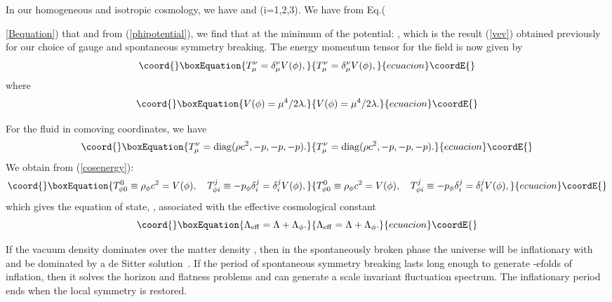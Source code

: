 \documentclass[a4paper,12pt]{article}
\begin{document}
In our homogeneous and isotropic cosmology, we have
\coordHE{} and \coordHE{} (i=1,2,3).
We have from Eq.({\ref{Bequation}) that
\coordHE{} and from (\ref{phipotential}), we find that at the
minimum of the potential: \coordHE{}, which is the result
(\ref{vev}) obtained previously for our choice of gauge and
spontaneous symmetry breaking. The energy momentum tensor for the
\myHighlight{$\phi_\mu$}\coordHE{} field is now given by
\begin{equation}\coord{}\boxEquation{
\label{cosenergy}
T_\mu^\nu=\delta^\nu_\mu V(\phi),
}{
T_\mu^\nu=\delta^\nu_\mu V(\phi),
}{ecuacion}\coordE{}\end{equation}
where
\begin{equation}\coord{}\boxEquation{
V(\phi)=\mu^4/2\lambda.
}{
V(\phi)=\mu^4/2\lambda.
}{ecuacion}\coordE{}\end{equation}

For the fluid in comoving coordinates, we have
\begin{equation}\coord{}\boxEquation{
T_\mu^\nu={\rm diag}(\rho c^2, -p, -p, -p).
}{
T_\mu^\nu={\rm diag}(\rho c^2, -p, -p, -p).
}{ecuacion}\coordE{}\end{equation}
We obtain from (\ref{cosenergy}):
\begin{equation}\coord{}\boxEquation{
T^0_{\phi0}\equiv\rho_\phi
c^2=V(\phi),\quad  T_{\phi i}^j\equiv -p_\phi\delta_i^j=\delta_i^jV(\phi),
}{
T^0_{\phi0}\equiv\rho_\phi
c^2=V(\phi),\quad  T_{\phi i}^j\equiv -p_\phi\delta_i^j=\delta_i^jV(\phi),
}{ecuacion}\coordE{}\end{equation}
which gives the equation of state, \coordHE{}, associated with the
effective cosmological constant
\begin{equation}\coord{}\boxEquation{
\Lambda_{\rm eff}=\Lambda+\Lambda_\phi.
}{
\Lambda_{\rm eff}=\Lambda+\Lambda_\phi.
}{ecuacion}\coordE{}\end{equation}

If the vacuum density \myHighlight{$\rho_\phi$}\coordHE{} dominates over the matter density \coordHE{}, then in
the spontaneously broken phase the universe will be inflationary with \coordHE{} and be dominated by a de Sitter solution~\cite{Linde}. If the period of
spontaneous symmetry breaking lasts long enough to generate \coordHE{}-efolds of
inflation, then it solves the horizon and flatness problems and can generate a
scale invariant fluctuation spectrum. The inflationary period ends when the local
\coordHE{} symmetry is restored.

}
\end{document}
